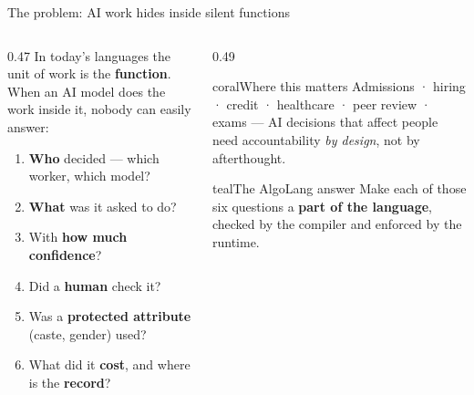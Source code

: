 \documentclass[aspectratio=169,11pt]{beamer}
\begin{document}

\begin{frame}{The problem: AI work hides inside silent functions}
\begin{columns}[T]
\begin{column}{0.47\textwidth}
In today's languages the unit of work is the \textbf{function}. When an AI model does the work inside it, nobody can easily answer:
\vspace{1mm}
\begin{enumerate}\small
  \item \textbf{Who} decided --- which worker, which model?
  \item \textbf{What} was it asked to do?
  \item With \textbf{how much confidence}?
  \item Did a \textbf{human} check it?
  \item Was a \textbf{protected attribute} (caste, gender) used?
  \item What did it \textbf{cost}, and where is the \textbf{record}?
\end{enumerate}
\end{column}
\begin{column}{0.49\textwidth}
\begin{card}{coral}{Where this matters}
Admissions · hiring · credit · healthcare · peer review · exams --- AI decisions that affect people need accountability \emph{by design}, not by afterthought.
\end{card}
\begin{card}{teal}{The AlgoLang answer}
Make each of those six questions a \textbf{part of the language}, checked by the compiler and enforced by the runtime.
\end{card}
\end{column}
\end{columns}
\end{frame}
\end{document}
